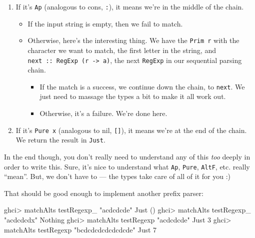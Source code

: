 \documentclass[]{article}
\newenvironment{Shaded}{}{}
\newcommand{\DataTypeTok}[1]{\textcolor[rgb]{0.56,0.13,0.00}{#1}}
\newcommand{\DecValTok}[1]{\textcolor[rgb]{0.25,0.63,0.44}{#1}}
\newcommand{\FunctionTok}[1]{\textcolor[rgb]{0.02,0.16,0.49}{#1}}
\newcommand{\NormalTok}[1]{#1}
\newcommand{\StringTok}[1]{\textcolor[rgb]{0.25,0.44,0.63}{#1}}
\begin{document}
\begin{enumerate}
\def\labelenumi{\arabic{enumi}.}
\item
  If it's \texttt{Ap} (analogous to cons, \texttt{:}), it means we're in the
  middle of the chain.

  \begin{itemize}
  \tightlist
  \item
    If the input string is empty, then we fail to match.
  \item
    Otherwise, here's the interesting thing. We have the \texttt{Prim\ r} with
    the character we want to match, the first letter in the string, and
    \texttt{next\ ::\ RegExp\ (r\ -\textgreater{}\ a)}, the next \texttt{RegExp}
    in our sequential parsing chain.

    \begin{itemize}
    \tightlist
    \item
      If the match is a success, we continue down the chain, to \texttt{next}.
      We just need to massage the types a bit to make it all work out.
    \item
      Otherwise, it's a failure. We're done here.
    \end{itemize}
  \end{itemize}
\item
  If it's \texttt{Pure\ x} (analogous to nil, \texttt{{[}{]}}), it means we're
  at the end of the chain. We return the result in \texttt{Just}.
\end{enumerate}

In the end though, you don't really need to understand any of this \emph{too}
deeply in order to write this. Sure, it's nice to understand what \texttt{Ap},
\texttt{Pure}, \texttt{AltF}, etc. really ``mean''. But, we don't have to ---
the types take care of all of it for you :)

That should be good enough to implement another prefix parser:

\begin{Shaded}
\begin{Highlighting}[]
\NormalTok{ghci}\FunctionTok{>}\NormalTok{ matchAlts testRegexp_ }\StringTok{"acdcdcde"}
\DataTypeTok{Just}\NormalTok{ ()}
\NormalTok{ghci}\FunctionTok{>}\NormalTok{ matchAlts testRegexp_ }\StringTok{"acdcdcdx"}
\DataTypeTok{Nothing}
\NormalTok{ghci}\FunctionTok{>}\NormalTok{ matchAlts testRegexp }\StringTok{"acdcdcde"}
\DataTypeTok{Just} \DecValTok{3}
\NormalTok{ghci}\FunctionTok{>}\NormalTok{ matchAlts testRegexp }\StringTok{"bcdcdcdcdcdcdcde"}
\DataTypeTok{Just} \DecValTok{7}
\end{Highlighting}
\end{Shaded}
\end{document}

